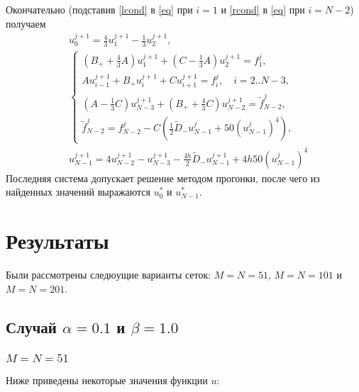 \documentclass[a4paper,12pt]{article}
\begin{document}
Окончательно (подставив \cref{lcond} в \cref{eq} при \(i=1\) и \cref{rcond} в \cref{eq} при \(i=N-2\)) получаем
\begin{align*}
   & u_{0}^{j+1} = \frac{4}{3}u_{1}^{j+1} - \frac{1}{3} u_{2}^{j+1},                                                                         \\
   & \begin{cases}
       \left(B_{+} + \frac{4}{3}A\right) u_{1}^{j+1} + \left(C - \frac{1}{3}A\right) u_{2}^{j+1} = f_{1}^{j},               \\
       A u_{i-1}^{j+1} + B_{+} u_{i}^{j+1} + C u_{i+1}^{j+1} =  f_{i}^{j}, \quad i=2..N-3,                                  \\
       \left(A - \frac{1}{3}C\right) u_{N-3}^{j+1} + \left(B_{+} + \frac{4}{3}C\right) u_{N-2}^{j+1} = \tilde{f}_{N-2}^{j}, \\
       \tilde{f}_{N-2}^{j} = f_{N-2}^{j} - C\left(\frac{1}{2}\tilde{D}_{-}u_{N-1}^{j} + 50\left(u_{N-1}^{j}\right)^4\right),
     \end{cases} \\
   & u_{N-1}^{j+1}= 4u_{N-2}^{j+1} - u_{N-3}^{j+1}-\frac{4h}{2}\tilde{D}_{-}u_{N-1}^{j+1} + 4h50\left(u_{N-1}^{j}\right)^4 
\end{align*}
Последняя система допускает решение методом прогонки, после чего из найденных значений выражаются \(u_{0}^{*}\) и \(u_{N-1}^{*}\).
\section*{Результаты}
Были рассмотрены следюущие варианты сеток: \(M=N=51\), \(M=N=101\) и \(M=N=201\).

\subsection*{Случай \(\alpha=0.1\) и \(\beta=1.0\)}

\subsubsection*{\(M=N=51\)}

Ниже приведены некоторые значения функции \(u\):
\end{document}
